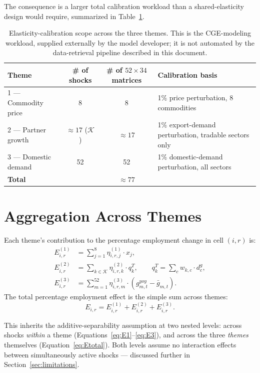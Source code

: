 \documentclass[11pt]{article}
\begin{document}
The consequence is a larger total calibration workload than a
shared-elasticity design would require, summarized in
Table~\ref{tab:elasticity-scope}.

\begin{table}[h]
\centering
\begin{tabular}{@{}lccl@{}}
\toprule
Theme & \# of shocks & \# of $52\times34$ matrices & Calibration basis \\
\midrule
1 --- Commodity price & 8 & 8 & 1\% price perturbation, 8 commodities \\
2 --- Partner growth & $\approx 17$ ($\mathcal{K}$) & $\approx 17$ & 1\%
  export-demand perturbation, tradable sectors only \\
3 --- Domestic demand & 52 & 52 & 1\% domestic-demand perturbation, all
  sectors \\
\midrule
\textbf{Total} & & $\approx 77$ & \\
\bottomrule
\end{tabular}
\caption{Elasticity-calibration scope across the three themes. This is the
CGE-modeling workload, supplied externally by the model developer; it is
not automated by the data-retrieval pipeline described in this document.}
\label{tab:elasticity-scope}
\end{table}

\section{Aggregation Across Themes}
\label{sec:aggregation}

Each theme's contribution to the percentage employment change in cell
$(i,r)$ is:
\begin{align}
  E_{i,r}^{(1)} &= \sum_{j=1}^{8} \eta_{i,r,j}^{(1)} \cdot x_j,
  \label{eq:E1} \\
  E_{i,r}^{(2)} &= \sum_{k \in \mathcal{K}} \eta_{i,r,k}^{(2)} \cdot q_k^T,
  \qquad q_k^T = \sum_{c} w_{k,c} \cdot d^g_c,
  \label{eq:E2} \\
  E_{i,r}^{(3)} &= \sum_{m=1}^{52} \eta_{i,r,m}^{(3)} \cdot
  \left(g_{m,t}^{yoy} - \bar g_{m,t}\right).
  \label{eq:E3}
\end{align}
The total percentage employment effect is the simple sum across themes:
\begin{equation}
  E_{i,r} = E_{i,r}^{(1)} + E_{i,r}^{(2)} + E_{i,r}^{(3)}.
  \label{eq:Etotal}
\end{equation}

This inherits the additive-separability assumption at two nested levels:
across shocks \emph{within} a theme (Equations~\eqref{eq:E1}--\eqref{eq:E3}),
and across the three \emph{themes} themselves (Equation~\eqref{eq:Etotal}).
Both levels assume no interaction effects between simultaneously active
shocks --- discussed further in Section~\ref{sec:limitations}.
\end{document}
